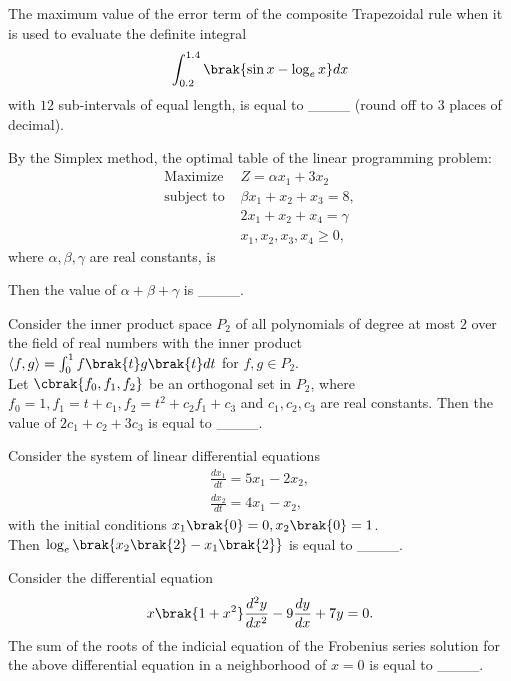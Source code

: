     \item The maximum value of the error term of the composite Trapezoidal rule when it is used to evaluate the definite integral
            \begin{align*}
                \int_{0.2}^{1.4} \brak{\sin x - \log_e x} dx
            \end{align*}
        with $12$ sub-intervals of equal length, is equal to \_\_\_\_ (round off to $3$ places of decimal).

    \item By the Simplex method, the optimal table of the linear programming problem:
            \begin{align*}
                \text{Maximize } &Z = \alpha x_1 + 3 x_2 \\
                \text{subject to } &\beta x_1 + x_2 + x_3 = 8,\\
                &2x_1 + x_2 + x_4 = \gamma \\
                &x_1, x_2, x_3, x_4 \geq 0,
            \end{align*}
        where $\alpha, \beta, \gamma$ are real constants, is
        \begin{table}[h!]
            \centering
            
            \caption{}
            \label{{52t}}
        \end{table}

    Then the value of $\alpha + \beta + \gamma$ is \_\_\_\_.

    \item Consider the inner product space $P_2$ of all polynomials of degree at most $2$ over the field of real numbers with the inner product $\langle f,g \rangle = \int_0^1 f \brak{t} g \brak{t} dt$ for $f,g \in P_2$. \\ Let $\cbrak{f_0, f_1, f_2}$ be an orthogonal set in $P_2$, where $f_0 = 1, f_1 = t+c_1, f_2 = t^2 + c_2 f_1 + c_3$ and $c_1,c_2,c_3$ are real constants. Then the value of $2c_1 + c_2 + 3 c_3$ is equal to \_\_\_\_.

    \item Consider the system of linear differential equations
        \begin{align*}
            \frac{dx_1}{dt} = 5x_1 - 2x_2,\\
            \frac{dx_2}{dt} = 4x_1 - x_2,
        \end{align*}
        with the initial conditions $x_1 \brak{0} = 0, x_2 \brak{0} =1$. \\ Then $\log_e \brak{x_2\brak{2} - x_1 \brak{2}}$ is equal to \_\_\_\_.

    \item Consider the differential equation
        \begin{align*}
            x \brak{1 + x^2} \frac{d^2y}{dx^2} - 9\frac{dy}{dx} + 7y =0.
        \end{align*}
        The sum of the roots of the indicial equation of the Frobenius series solution for the above differential equation in a neighborhood of $x=0$ is equal to \_\_\_\_.
